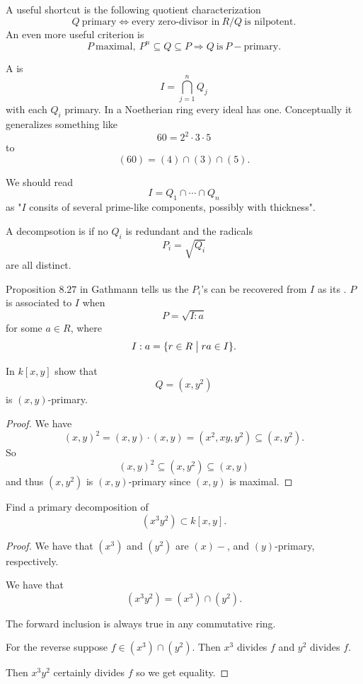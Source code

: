 \documentclass[11pt]{article}
\begin{document}
A useful shortcut is the following 
quotient characterization 
\[
    Q \ \text{primary} \Leftrightarrow \text{every zero-divisor 
    in} \ R/Q \ \text{is nilpotent}. 
\]
An even more useful criterion is 
\[
    P \ \text{maximal}, 
    \ P^n \subseteq Q \subseteq P \Rightarrow 
    Q \ \text{is} \ P-\text{primary}. 
\]

A  
is 
\[
    I = \bigcap_{j=1}^n Q_j 
\]
with each $Q_i$ primary. 
In a Noetherian ring every ideal 
has one. Conceptually it 
generalizes something like 
\[
    60 = 2^2 \cdot 3 \cdot 5 
\]
to 
\[
    (60) = (4) \cap (3) \cap (5). 
\]

We should read 
\[
    I = Q_1 \cap \cdots \cap Q_n 
\]
as "$I$ consits of several prime-like components, 
possibly with thickness". 

A decompsotion is  
if no $Q_i$ is redundant and the radicals 
\[
    P_i = \sqrt{Q_i} 
\]
are all distinct. 

Proposition $8.27$ in Gathmann tells us the 
$P_i$'s can be recovered from $I$ as 
its . 
$P$ is associated to $I$ when 
\[
    P = \sqrt{I : a}
\]
for some $a \in R$, where 
\[
    I : a = \{r \in R \bigm| ra \in I\}. 
\]

\begin{prob}
    In $k[x,y]$ show that 
    \[
        Q = (x,y^2)
    \]
    is $(x,y)$-primary. 
\end{prob}
\begin{proof}
    We have 
    \[
        (x,y)^2 = (x,y)\cdot (x,y) = (x^2,xy,y^2) 
        \subseteq (x,y^2). 
    \]
    So 
    \[
        (x,y)^2 \subseteq (x,y^2) \subseteq (x,y)
    \]
    and thus $(x,y^2)$ is $(x,y)$-primary 
    since $(x,y)$ is maximal. 
\end{proof}
\begin{prob}
    Find a primary decomposition of 
    \[
        (x^3y^2) \subset k[x,y]. 
    \]
\end{prob}
\begin{proof}
    We have that $(x^3)$ and 
    $(y^2)$ are $(x)-$, and $(y)$-primary, respectively. 

    We have that 
    \[
        (x^3y^2) = (x^3) \cap (y^2). 
    \]

    The forward inclusion is 
    always true in any commutative ring. 

    For the reverse suppose 
    $f \in (x^3) \cap (y^2)$. Then 
    $x^3$ divides $f$ and 
    $y^2$ divides $f$. 
    
    Then $x^3y^2$ certainly divides $f$ so 
    we get equality. 
\end{proof}
\end{document}
